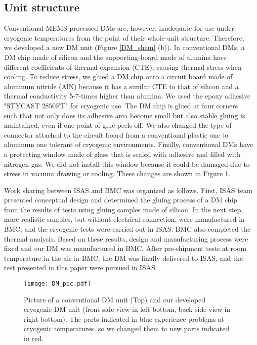 \documentclass[a4paper]{article}
\begin{document}
\subsection{Unit structure}
\label{DM_unit}
Conventional MEMS-processed DMs are, however, inadequate for use under cryogenic temperatures from the point of their whole-unit structure. Therefore, we developed a new DM unit (Figure \ref{DM_shem} (b)). In conventional DMs, a DM chip made of silicon and the supporting-board made of alumina have different coefficients of thermal expansion (CTE), causing thermal stress when cooling. To reduce stress, we glued a DM chip onto a circuit board made of aluminum nitride (AlN) because it has a similar CTE to that of silicon and a thermal conductivity 5-7-times higher than alumina. We used the epoxy adhesive "STYCAST 2850FT" for cryogenic use. The DM chip is glued at four corners such that not only does its adhesive area become small but also stable gluing is maintained, even if one point of glue peels off. We also changed the type of connector attached to the circuit board from a conventional plastic one to aluminum one tolerant of cryogenic environments. Finally, conventional DMs have a protecting window made of glass that is sealed with adhesive and filled with nitrogen gas. We did not install this window because it could be damaged due to stress in vacuum drawing or cooling. These changes are shown in Figure \ref{DM_pic}. 

Work sharing between ISAS and BMC was organized as follows. First, ISAS team presented conceptual design and determined the gluing process of a DM chip from the results of tests using gluing samples made of silicon. In the next step, more realistic samples, but without electrical connection, were manufactured in BMC, and the cryogenic tests were carried out in ISAS. BMC also completed the thermal analysis. Based on these results, design and manufacturing process were fixed and our DM was manufactured in BMC. After pre-shipment tests at room temperature in the air in BMC, the DM was finally delivered to ISAS, and the test presented in this paper were pursued in ISAS.

\begin{figure}[tb]
\centering
\texttt{[image: DM\_pic.pdf]}
\caption{Picture of a conventional DM unit (Top) and our developed cryogenic DM unit (front side view in left bottom, back side view in right bottom). The parts indicated in blue experience problems at cryogenic temperatures, so we changed them to new parts indicated in red.}
\label{DM_pic}
\end{figure}
\end{document}
